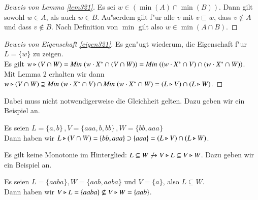 \begin{proof}[Beweis von Lemma \ref{lem321}]
Es sei $w\in (\min(A) \cap \min(B))$. Dann gilt sowohl $w\in A$, als auch $w\in B$. Au"serdem gilt f"ur alle $v$ mit $v\sqsubset w$, dass $v \notin A$ und dass $v \notin B$. Nach Definition von $\min$ gilt also $w\in \min(A\cap B)$.\emph{}
\end{proof}
\begin{proof}[Beweis von Eigenschaft \ref{eigen321}]
Es gen"ugt wiederum, die Eigenschaft f"ur $L=\{w\}$ zu zeigen.\\
Es gilt $w\triangleright (V\cap W) = \mathit{Min}\;(w\cdot X^* \cap (V \cap W))= \mathit{Min}\;((w\cdot X^* \cap V) \cap (w\cdot X^* \cap W))$.\\
Mit Lemma 2 erhalten wir dann\\
$ w\triangleright (V\cap W) \supseteq \mathit{Min}\;(w\cdot X^* \cap V) \cap \mathit{Min}\;(w\cdot X^* \cap W)=(L\triangleright V) \cap (L\triangleright W)$.
\end{proof}
Dabei muss nicht notwendigerweise die Gleichheit gelten. Dazu geben wir ein Beispiel an.

\vspace{2ex}

\begin{beispiel}
Es seien $L= \{a,b\}\, ,V =\{aaa,b,bb\}\, ,W = \{bb,aaa\}$\\
Dann haben wir $L\triangleright (V\cap W) = \{bb,aaa\} \supset \{ aaa \} =(L\triangleright V) \cap (L\triangleright W)$.
\end{beispiel}

Es gilt keine Monotonie im Hinterglied: $L\subseteq W \not\to V\triangleright L \subseteq V \triangleright W$. Dazu geben wir ein Beispiel an.

\vspace{2ex}

\begin{beispiel}
Es seien $L=\{aaba\},W=\{aab,aaba\}$ und $V=\{a\}$, also $L\subseteq W$.\\
Dann haben wir $V\triangleright L = \{aaba\} \not\subseteq V\triangleright W =\{aab\}$.
\end{beispiel}



